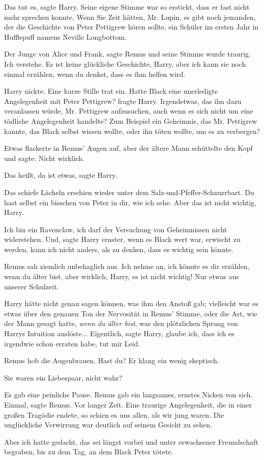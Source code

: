 \glqq{}Das tut es\grqq{}, sagte Harry. Seine eigene Stimme war so erstickt, dass
er fast nicht mehr sprechen konnte. \glqq{}Wenn Sie Zeit hätten, Mr. Lupin, es
gibt noch jemanden, der die Geschichte von Peter Pettigrew hören sollte, ein
Schüler im ersten Jahr in Hufflepuff namens Neville Longbottom.\grqq{}

\glqq{}Der Junge von Alice und Frank\grqq{}, sagte Remus und seine Stimme wurde
traurig. \glqq{}Ich verstehe. Es ist keine glückliche Geschichte, Harry, aber ich
kann sie noch einmal erzählen, wenn du denkst, dass es ihm helfen wird.\grqq{}

Harry nickte. Eine kurze Stille trat ein. \glqq{}Hatte Black eine unerledigte
Angelegenheit mit Peter Pettigrew?\grqq{} fragte Harry. \glqq{}Irgendetwas, das
ihn dazu veranlassen würde, Mr. Pettigrew aufzusuchen, auch wenn es sich nicht
um eine tödliche Angelegenheit handelte? Zum Beispiel ein Geheimnis, das Mr.
Pettigrew kannte, das Black selbst wissen wollte, oder ihn töten wollte, um es
zu verbergen?\grqq{}

Etwas flackerte in Remus' Augen auf, aber der ältere Mann schüttelte den Kopf
und sagte: \glqq{}Nicht wirklich.\grqq{}

\glqq{}Das heißt, da ist etwas\grqq{}, sagte Harry.

Das schiefe Lächeln erschien wieder unter dem Salz-und-Pfeffer-Schnurrbart.
\glqq{}Du hast selbst ein bisschen von Peter in dir, wie ich sehe. Aber das ist
nicht wichtig, Harry.\grqq{}

\glqq{}Ich bin ein Ravenclaw, ich darf der Versuchung von Geheimnissen nicht
widerstehen. Und\grqq{}, sagte Harry ernster, \glqq{}wenn es Black wert war,
erwischt zu werden, kann ich nicht anders, als zu denken, dass es wichtig sein
könnte.\grqq{}

Remus sah ziemlich unbehaglich aus. \glqq{}Ich nehme an, ich könnte es dir
erzählen, wenn du älter bist, aber wirklich, Harry, es ist nicht wichtig! Nur
etwas aus unserer Schulzeit.\grqq{}

Harry hätte nicht genau sagen können, was ihm den Anstoß gab; vielleicht war es
etwas über den genauen Ton der Nervosität in Remus' Stimme, oder die Art, wie
der Mann gesagt hatte, \emph{wenn du älter bist}, was den plötzlichen Sprung von
Harrys Intuition auslöste... \glqq{}Eigentlich\grqq{}, sagte Harry, \glqq{}glaube
ich, dass ich es irgendwie schon erraten habe, tut mir Leid.\grqq{}

Remus hob die Augenbrauen. \glqq{}Hast du?\grqq{} Er klang ein wenig skeptisch.

\glqq{}Sie waren ein Liebespaar, nicht wahr?\grqq{}

Es gab eine peinliche Pause. Remus gab ein langsames, ernstes Nicken von sich.
\glqq{}Einmal\grqq{}, sagte Remus. \glqq{}Vor langer Zeit. Eine traurige
Angelegenheit, die in einer großen Tragödie endete, so schien es uns allen, als
wir jung waren.\grqq{} Die unglückliche Verwirrung war deutlich auf seinem Gesicht zu
sehen.

\glqq{}Aber ich hatte gedacht, das sei längst vorbei und unter erwachsener
Freundschaft begraben, bis zu dem Tag, an dem Black Peter tötete.\grqq{}

